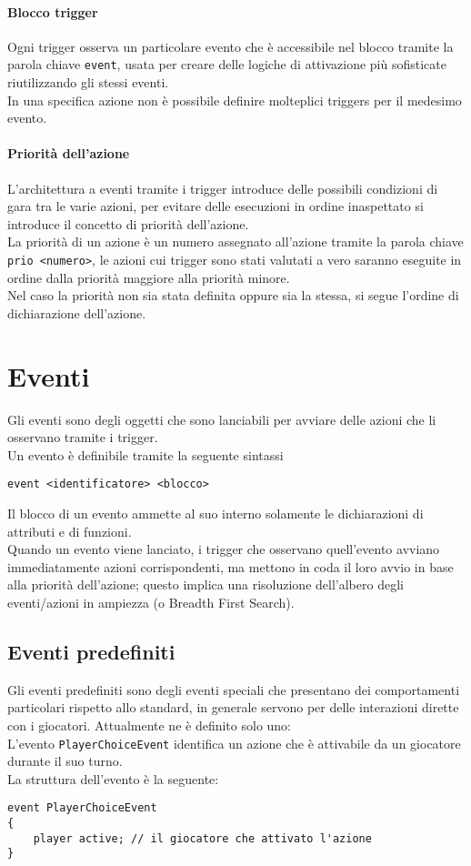 \paragraph{Blocco trigger}
Ogni trigger osserva un particolare evento che è accessibile nel blocco tramite la parola chiave 
\lstinline|event|, usata per creare delle logiche di attivazione più sofisticate riutilizzando gli stessi eventi. \\
In una specifica azione non è possibile definire molteplici triggers per il medesimo evento.

\paragraph{Priorità dell'azione}
L'architettura a eventi tramite i trigger introduce delle possibili condizioni di gara tra le varie azioni,
per evitare delle esecuzioni in ordine inaspettato si introduce il concetto di priorità dell'azione. \\
La priorità di un azione è un numero assegnato all'azione tramite la parola chiave \\
\lstinline|prio <numero>|,
le azioni cui trigger sono stati valutati a vero saranno eseguite in ordine dalla priorità maggiore
alla priorità minore. \\
Nel caso la priorità non sia stata definita oppure sia la stessa, si segue l'ordine di dichiarazione dell'azione.

\section{Eventi}
Gli eventi sono degli oggetti che sono lanciabili per avviare delle azioni che li osservano tramite i trigger. \\
Un evento è definibile tramite la seguente sintassi
\begin{lstlisting}
event <identificatore> <blocco>
\end{lstlisting}
Il blocco di un evento ammette al suo interno solamente le dichiarazioni di attributi e di funzioni. \\
Quando un evento viene lanciato, i trigger che osservano quell'evento avviano immediatamente azioni corrispondenti,
ma mettono in coda il loro avvio in base alla priorità dell'azione; questo implica
una risoluzione dell'albero degli eventi/azioni in ampiezza (o Breadth First Search).

\subsection{Eventi predefiniti}
Gli eventi predefiniti sono degli eventi speciali che presentano dei comportamenti particolari rispetto 
allo standard, in generale servono per delle interazioni dirette con i giocatori.
Attualmente ne è definito solo uno: \\
L'evento \lstinline|PlayerChoiceEvent| identifica un azione che è attivabile da un giocatore durante il suo turno. \\
La struttura dell'evento è la seguente:
\begin{lstlisting}
event PlayerChoiceEvent
{
    player active; // il giocatore che attivato l'azione
}
\end{lstlisting}

